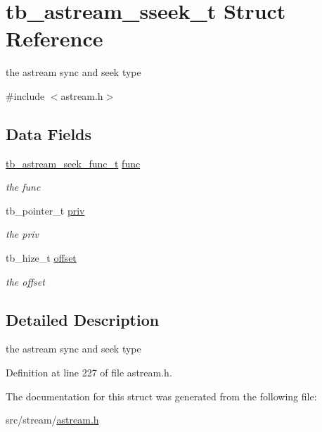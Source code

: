 \hypertarget{structtb__astream__sseek__t}{\section{tb\-\_\-astream\-\_\-sseek\-\_\-t Struct Reference}
\label{structtb__astream__sseek__t}
}


the astream sync and seek type  




{\ttfamily \#include $<$astream.\-h$>$}

\subsection*{Data Fields}
\begin{DoxyCompactItemize}
\item 
\hypertarget{structtb__astream__sseek__t_a5e3ba3191cab76759ec1b8357356b713}{\hyperlink{astream_8h_a2c68bce4ed336abc6759878c0d083c5d}{tb\-\_\-astream\-\_\-seek\-\_\-func\-\_\-t} \hyperlink{structtb__astream__sseek__t_a5e3ba3191cab76759ec1b8357356b713}{func}}\label{structtb__astream__sseek__t_a5e3ba3191cab76759ec1b8357356b713}

\begin{DoxyCompactList}\small\item\em the func \end{DoxyCompactList}\item 
\hypertarget{structtb__astream__sseek__t_a67fbb119a4417b34cc9460ce62a2b848}{tb\-\_\-pointer\-\_\-t \hyperlink{structtb__astream__sseek__t_a67fbb119a4417b34cc9460ce62a2b848}{priv}}\label{structtb__astream__sseek__t_a67fbb119a4417b34cc9460ce62a2b848}

\begin{DoxyCompactList}\small\item\em the priv \end{DoxyCompactList}\item 
\hypertarget{structtb__astream__sseek__t_ae6d71320a66c4e48ef3922491d609a75}{tb\-\_\-hize\-\_\-t \hyperlink{structtb__astream__sseek__t_ae6d71320a66c4e48ef3922491d609a75}{offset}}\label{structtb__astream__sseek__t_ae6d71320a66c4e48ef3922491d609a75}

\begin{DoxyCompactList}\small\item\em the offset \end{DoxyCompactList}\end{DoxyCompactItemize}


\subsection{Detailed Description}
the astream sync and seek type 

Definition at line 227 of file astream.\-h.



The documentation for this struct was generated from the following file\-:\begin{DoxyCompactItemize}
\item 
src/stream/\hyperlink{astream_8h}{astream.\-h}\end{DoxyCompactItemize}
